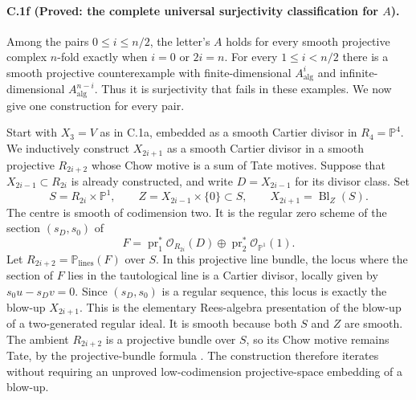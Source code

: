 \paragraph{C.1f (Proved: the complete universal surjectivity classification for $A$).}
Among the pairs $0\le i\le n/2$, the letter's $A$ holds for every
smooth projective complex $n$-fold exactly when $i=0$ or $2i=n$.
For every $1\le i<n/2$ there is a smooth projective counterexample
with finite-dimensional $A^i_{\mathrm{alg}}$ and infinite-dimensional
$A^{n-i}_{\mathrm{alg}}$. Thus it is surjectivity that fails in these
examples. We now give one construction for every pair.

Start with $X_3=V$ as in C.1a, embedded as a smooth Cartier divisor
in $R_4=\mathbb P^4$. We inductively construct $X_{2i+1}$ as a smooth
Cartier divisor in a smooth projective $R_{2i+2}$ whose Chow motive
is a sum of Tate motives. Suppose that $X_{2i-1}\subset R_{2i}$ is
already constructed, and write $D=X_{2i-1}$ for its divisor class.
Set
\[
 S=R_{2i}\times\mathbb P^1,
 \qquad Z=X_{2i-1}\times\{0\}\subset S,
 \qquad X_{2i+1}=\operatorname{Bl}_Z(S).
\]
The centre is smooth of codimension two. It is the regular zero
scheme of the section $(s_D,s_0)$ of
\[
 F=\operatorname{pr}_1^*\mathcal O_{R_{2i}}(D)
          \oplus\operatorname{pr}_2^*\mathcal O_{\mathbb P^1}(1).
\]
Let $R_{2i+2}=\mathbb P_{\mathrm{lines}}(F)$ over $S$. In this
projective line bundle, the locus where the section of $F$ lies
in the tautological line is a Cartier divisor, locally given by
$s_0u-s_Dv=0$. Since $(s_D,s_0)$ is a regular sequence, this locus
is exactly the blow-up $X_{2i+1}$. This is the elementary Rees-algebra
presentation of the blow-up of a two-generated regular ideal.
It is smooth because both $S$ and $Z$ are smooth. The ambient
$R_{2i+2}$ is a projective bundle over $S$, so its Chow motive remains
Tate, by the projective-bundle formula
\citep[Lemma 45.6.1, Tag 0FGQ]{cyStacksProject}. The construction therefore iterates without requiring an
unproved low-codimension projective-space embedding of a blow-up.

